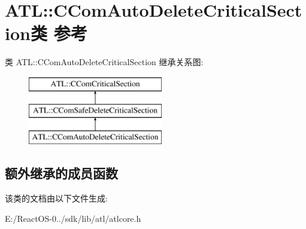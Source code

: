 \hypertarget{class_a_t_l_1_1_c_com_auto_delete_critical_section}{}\section{A\+TL\+:\+:C\+Com\+Auto\+Delete\+Critical\+Section类 参考}
\label{class_a_t_l_1_1_c_com_auto_delete_critical_section}
类 A\+TL\+:\+:C\+Com\+Auto\+Delete\+Critical\+Section 继承关系图\+:\begin{figure}[H]
\begin{center}
\leavevmode
\includegraphics[height=3.000000cm]{class_a_t_l_1_1_c_com_auto_delete_critical_section}
\end{center}
\end{figure}
\subsection*{额外继承的成员函数}


该类的文档由以下文件生成\+:\begin{DoxyCompactItemize}
\item 
E\+:/\+React\+O\+S-\/0../sdk/lib/atl/atlcore.\+h\end{DoxyCompactItemize}
